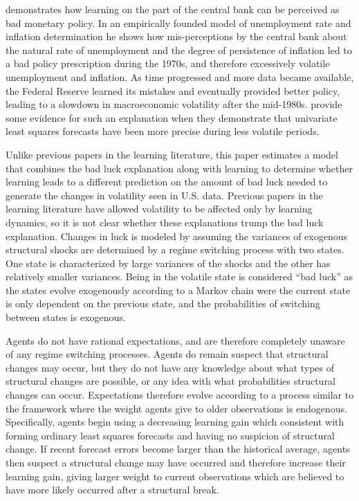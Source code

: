  demonstrates how learning on the part of the central bank can be perceived as bad monetary policy.  In an empirically founded model of unemployment rate and inflation determination he shows how mis-perceptions by the central bank about the natural rate of unemployment and the degree of persistence of inflation led to a bad policy prescription during the 1970s, and therefore excessively volatile unemployment and inflation.  As time progressed and more data became available, the Federal Reserve learned its mistakes and eventually provided better policy, leading to a slowdown in macroeconomic volatility after the mid-1980s.   provide some evidence for such an explanation when they demonstrate that univariate least squares forecasts have been more precise during less volatile periods.

Unlike previous papers in the learning literature, this paper estimates a model that combines the bad luck explanation along with learning to determine whether learning leads to a different prediction on the amount of bad luck needed to generate the changes in volatility seen in U.S. data.  Previous papers in the learning literature have allowed volatility to be affected only by learning dynamics, so it is not clear whether these explanations trump the bad luck explanation.  Changes in luck is modeled by assuming the variances of exogenous structural shocks are determined by a regime switching process with two states.  One state is characterized by large variances of the shocks and the other has relatively smaller variances.  Being in the volatile state is considered ``bad luck'' as the states evolve exogenously according to a Markov chain were the current state is only dependent on the previous state, and the probabilities of switching between states is exogenous.  

Agents do not have rational expectations, and are therefore completely unaware of any regime switching processes.  Agents do remain suspect that structural changes may occur, but they do not have any knowledge about what types of structural changes are possible, or any idea with what probabilities structural changes can occur.  Expectations therefore evolve according to a process similar to the  framework where the weight agents give to older observations is endogenous.  Specifically, agents begin using a decreasing learning gain which consistent with forming ordinary least squares forecasts and having no suspicion of structural change.  If recent forecast errors become larger than the historical average, agents then suspect a structural change may have occurred and therefore increase their learning gain, giving larger weight to current observations which are believed to have more likely occurred after a structural break.

